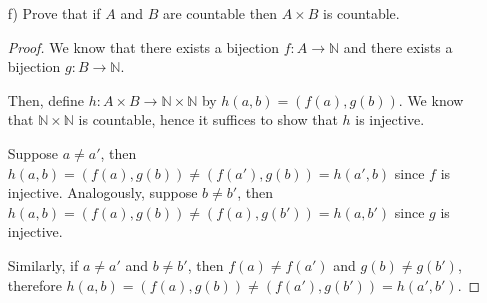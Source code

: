 \documentclass[11pt]{article}
\newcommand{\bbN}{\mathbb{N}}
\theoremstyle{definition}
\numberwithin{equation}{subsection}
\begin{document}
\begin{enumerate}
\begin{enumerate}
\begin{proof}
Let the countable sets $A_i$ be indexed by $i$ and let the elements of each of the countable sets $A_i$ be indexed by $j$. Then, every element in the countable union of countable sets (i.e., every element in $\bigcup_{i\in\bbN} A_i$) can be specified as $a_{ij}$ (i.e., the $j$th element of the $i$th set). For example, $A_1 = \{a_{11}, a_{12}, a_{13}, \dots \}$.

Let $M = \bigcup_{i\in\bbN} A_i$, then it suffices to show that there exists an injection $f \colon M \rightarrow \bbN \times \bbN$, since we know that $\bbN \times \bbN$ is countable.

For all $m \in M$, let $f(m)=(i,j)$. We want to show that $f$ is injective.

Case 1: $m, m' \in A_i, m \not= m'$. It follows that $m = a_{ij}$ and $m' = a_{ij'}$ for some $j,j'$. Then, $f(m) = (i,j) \not= (i,j') = f(m')$.

Case 2: $m \in A_i, m' \in A_{i'}$. It follows that $m \not= m'$. We know that $m = a_{ij}$ and $m' = a_{i'j'}$.

Subcase 2a: $j = j'$. Then, $f(m) = (i,j) \not= (i',j) = f(m').$

Subcase 2b: $j \not= j'$. Then, $f(m) = (i,j) \not= (i',j') = f(m').$

Therefore, $f$ is injective and this completes the proof.

\renewcommand\qedsymbol{QED}
\end{proof}
  
  \item[f)]  Prove that if $A$ and $B$ are countable then $A\times B$ is countable.

\begin{proof}
We know that there exists a bijection $f \colon A \rightarrow \bbN$ and there exists a bijection $g \colon B \rightarrow \bbN$. 

Then, define $h \colon A \times B \rightarrow \bbN \times \bbN$ by $h(a,b)=(f(a),g(b))$. We know that $\bbN \times \bbN$ is countable, hence it suffices to show that $h$ is injective.

Suppose $a \not = a'$, then $h(a,b)=(f(a),g(b)) \not= (f(a'),g(b)) = h(a',b)$ since $f$ is injective. Analogously, suppose $b \not = b'$, then $h(a,b)=(f(a),g(b)) \not= (f(a),g(b')) = h(a,b')$ since $g$ is injective. 

Similarly, if $a \not = a'$ and $b \not = b'$, then $f(a) \not= f(a')$ and $g(b) \not= g(b')$, therefore $h(a,b) =(f(a),g(b)) \not =(f(a'),g(b')) = h(a',b')$.


\end{proof}
\end{enumerate}
\end{enumerate}
\end{document}
